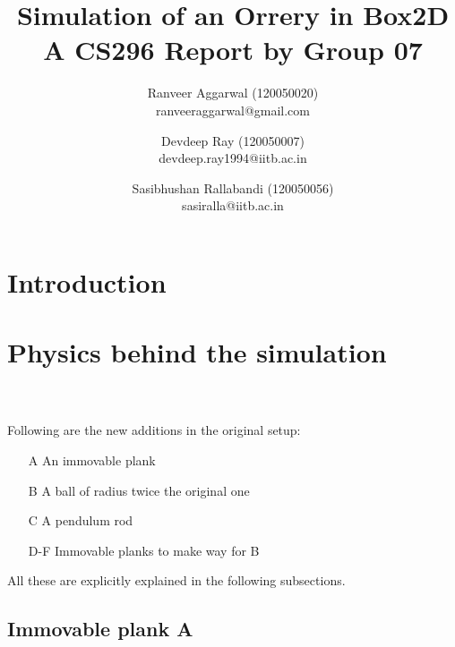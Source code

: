 \documentclass[11pt]{article}
\title{Simulation of an Orrery in Box2D\\ A CS296 Report by Group 07}
\author{Ranveer Aggarwal (120050020) \\ ranveeraggarwal@gmail.com \and Devdeep Ray (120050007) \\ devdeep.ray1994@iitb.ac.in \and Sasibhushan Rallabandi (120050056) \\ sasiralla@iitb.ac.in}
\date{}
\begin{document}
\maketitle

\section{Introduction}

\pagebreak

\section{Physics behind the simulation}

\setlength\fboxsep{2pt}
\setlength\fboxrule{1pt}
\\
\\
Following are the new additions in the original setup:
\begin{itemize}
\item[A] An immovable plank
\item[B] A ball of radius twice the original one
\item[C] A pendulum rod
\item[D-F] Immovable planks to make way for B
\end{itemize}
All these are explicitly explained in the following subsections.

\pagebreak

\subsection{Immovable plank A}
\setlength\fboxsep{2pt}
\setlength\fboxrule{1pt}
\\
\end{document}
